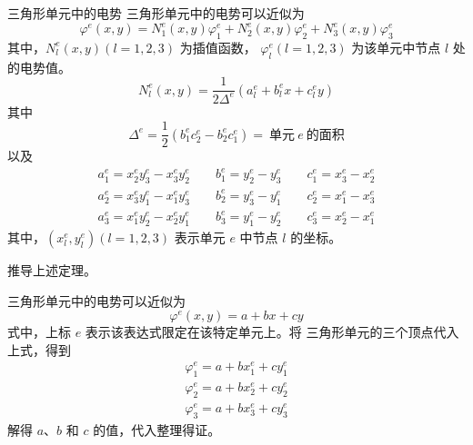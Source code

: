 \begin{theorem}{三角形单元中的电势}
    三角形单元中的电势可以近似为
    \begin{equation}
        \varphi^e(x,y)=N_1^e(x,y)\varphi_1^e
        +N_2^e(x,y)\varphi_2^e
        +N_3^e(x,y)\varphi_3^e
    \end{equation}
    其中，$N_l^e(x,y)(l=1,2,3)$ 为插值函数，
    $\varphi_l^e(l=1,2,3)$ 为该单元中节点 $l$ 处的电势值。
    \begin{equation}
        N_l^e(x,y)=\frac{1}{2\Delta^e}
        (a_l^e+ b_l^ex+c_l^ey)
    \end{equation}
    其中
    \begin{equation}
        \Delta^e=\frac{1}{2}
        (b_1^ec_2^e-b_2^ec_1^e)
        =\ \text{单元}\ e\ \text{的面积}
    \end{equation}
    以及
    \begin{equation}
        \begin{gathered}
            a_1^e=x_2^ey_3^e-x_3^ey_2^e
            \qquad b_1^e=y_2^e-y_3^e
            \qquad c_1^e=x_3^e-x_2^e\\
            a_2^e=x_3^ey_1^e-x_1^ey_3^e
            \qquad b_2^e=y_3^e-y_1^e
            \qquad c_2^e=x_1^e-x_3^e\\
            a_3^e=x_1^ey_2^e-x_2^ey_1^e
            \qquad b_3^e=y_1^e-y_2^e
            \qquad c_3^e=x_2^e-x_1^e
        \end{gathered}
    \end{equation}
    其中，$(x_l^e,y_l^e)(l=1,2,3)$ 表示单元 $e$ 中节点 $l$ 的坐标。
\end{theorem}

\begin{exercise}
    推导上述定理。
\end{exercise}

\begin{solution}
    三角形单元中的电势可以近似为
    \begin{equation*}
        \varphi^e(x,y)=a+bx+cy
    \end{equation*}
    式中，上标 $e$ 表示该表达式限定在该特定单元上。将
    三角形单元的三个顶点代入上式，得到
    \begin{gather*}
        \varphi_1^e=a+bx_1^e+cy_1^e\\
        \varphi_2^e=a+bx_2^e+cy_2^e\\
        \varphi_3^e=a+bx_3^e+cy_3^e
    \end{gather*}
    解得 $a$、$b$ 和 $c$ 的值，代入整理得证。
\end{solution}

